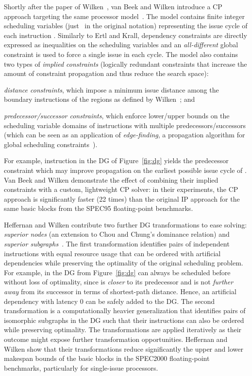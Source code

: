 \documentclass[acmsmall,authorversion,nonacm]{acmart}
\newcommand{\var}[2]{}
\begin{document}
Shortly after the paper of Wilken~\etal{}, van Beek and Wilken
introduce a CP approach targeting the same processor
model~\cite{VanBeek2001}.
The model contains finite integer scheduling variables \var{s}{i}
(just~ in the original notation) representing the issue cycle of
each instruction .
Similarly to Ertl and Krall, dependency constraints are directly
expressed as inequalities on the scheduling variables and an
\emph{all-different} global constraint is used to force a single issue
in each cycle.
The model also contains two types of \emph{implied constraints}
(logically redundant constraints that increase the amount of
constraint propagation and thus reduce the search space):
\begin{inparaitem}[]
\item \emph{distance constraints}, which impose a minimum issue
  distance among the boundary instructions of the regions as defined
  by Wilken~\etal{}; and
\item \emph{predecessor/successor constraints}, which enforce
  lower/upper bounds on the scheduling variable domains of
  instructions with multiple predecessors/successors (which can be
  seen as an application of \emph{edge-finding}, a propagation
  algorithm for global scheduling constraints~\cite{CPH:global}).
\end{inparaitem}
For example, instruction  in the DG of
Figure~\ref{fig:dg} yields the predecessor constraint
 which may improve propagation on
the earliest possible issue cycle of .
Van Beek and Wilken demonstrate the effect of combining their implied
constraints with a custom, lightweight CP solver: in their
experiments, the CP approach is significantly faster (22 times) than
the original IP approach for the same basic blocks from the SPEC95
floating-point benchmarks.

Heffernan and Wilken contribute two further DG transformations to ease
solving: \emph{superior nodes} (an extension to Chou and Chung's
dominance relation) and \emph{superior
  subgraphs}~\cite{Heffernan2006}.
The first transformation identifies pairs of independent instructions
with equal resource usage that can be ordered with artificial
dependencies while preserving the optimality of the original
scheduling problem.
For example,  in the DG from Figure~\ref{fig:dg} can
always be scheduled before  without loss of optimality,
since  is \emph{closer} to its predecessor 
and  is not \emph{further away} from its successor
 in terms of shortest-path distance.
Hence, an artificial dependency 
with latency 0 can be safely added to the DG.
The second transformation is a computationally heavier generalization
that identifies pairs of isomorphic subgraphs in the DG such that
their instructions can also be ordered while preserving optimality.
The transformations are applied iteratively as their outcome might
expose further transformation opportunities.
Heffernan and Wilken show that their transformations reduce
significantly the upper and lower makespan bounds of the basic blocks
in the SPEC2000 floating-point benchmarks, particularly for
single-issue processors.
\end{document}
